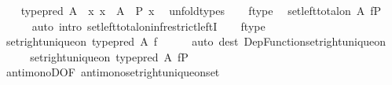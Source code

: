 \begin{isabellebody}
\ \ \isamarkupfalse%
\ {\isachardoublequoteopen}type{\isacharunderscore}{\kern0pt}pred\ {\isacharquery}{\kern0pt}A{\isacharprime}{\kern0pt}\ {\isacharequal}{\kern0pt}\ {\isacharparenleft}{\kern0pt}{\isasymlambda}x{\isachardot}{\kern0pt}\ x\ {\isacharcolon}{\kern0pt}\ A\ {\isasymand}\ P\ x{\isacharparenright}{\kern0pt}{\isachardoublequoteclose}\ \isamarkupfalse%
\ unfold{\isacharunderscore}{\kern0pt}types\isanewline
\ \ \isamarkupfalse%
\ f{\isacharunderscore}{\kern0pt}type\ \isamarkupfalse%
\ {\isachardoublequoteopen}set{\isacharunderscore}{\kern0pt}left{\isacharunderscore}{\kern0pt}total{\isacharunderscore}{\kern0pt}on\ {\isacharquery}{\kern0pt}A{\isacharprime}{\kern0pt}\ f{\isasymrestriction}\isactrlbsub P\isactrlesub {\isachardoublequoteclose}\isanewline
\ \ \ \ \isamarkupfalse%
\ {\isacharparenleft}{\kern0pt}auto\ intro{\isacharcolon}{\kern0pt}\ set{\isacharunderscore}{\kern0pt}left{\isacharunderscore}{\kern0pt}total{\isacharunderscore}{\kern0pt}on{\isacharunderscore}{\kern0pt}inf{\isacharunderscore}{\kern0pt}restrict{\isacharunderscore}{\kern0pt}leftI{\isacharparenright}{\kern0pt}\isanewline
\ \ \isamarkupfalse%
\ f{\isacharunderscore}{\kern0pt}type\ \isamarkupfalse%
\ {\isachardoublequoteopen}set{\isacharunderscore}{\kern0pt}right{\isacharunderscore}{\kern0pt}unique{\isacharunderscore}{\kern0pt}on\ {\isacharparenleft}{\kern0pt}type{\isacharunderscore}{\kern0pt}pred\ A{\isacharparenright}{\kern0pt}\ f{\isachardoublequoteclose}\isanewline
\ \ \ \ \isamarkupfalse%
\ {\isacharparenleft}{\kern0pt}auto\ dest{\isacharcolon}{\kern0pt}\ Dep{\isacharunderscore}{\kern0pt}Function{\isacharunderscore}{\kern0pt}set{\isacharunderscore}{\kern0pt}right{\isacharunderscore}{\kern0pt}unique{\isacharunderscore}{\kern0pt}on{\isacharparenright}{\kern0pt}\isanewline
\ \ \isamarkupfalse%
\ \isamarkupfalse%
\ {\isachardoublequoteopen}set{\isacharunderscore}{\kern0pt}right{\isacharunderscore}{\kern0pt}unique{\isacharunderscore}{\kern0pt}on\ {\isacharparenleft}{\kern0pt}type{\isacharunderscore}{\kern0pt}pred\ A{\isacharparenright}{\kern0pt}\ f{\isasymrestriction}\isactrlbsub P\isactrlesub {\isachardoublequoteclose}\isanewline
\ \ \ \ \isamarkupfalse%
\ antimonoD{\isacharbrackleft}{\kern0pt}OF\ antimono{\isacharunderscore}{\kern0pt}set{\isacharunderscore}{\kern0pt}right{\isacharunderscore}{\kern0pt}unique{\isacharunderscore}{\kern0pt}on{\isacharunderscore}{\kern0pt}set{\isacharbrackright}{\kern0pt}\isanewline

\end{isabellebody}

